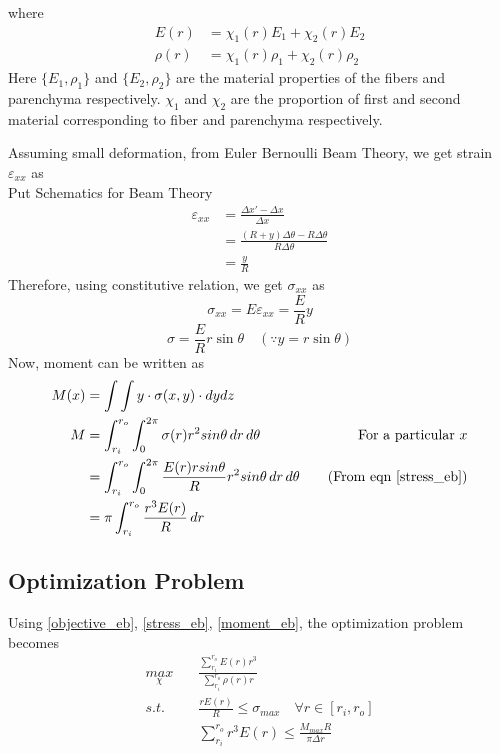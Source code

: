 \documentclass[10pt]{article}
\begin{document}
where 
\begin{equation}
\begin{split}
E(r) &= \chi_1(r) E_1 + \chi_2(r) E_2\\
\rho(r) &= \chi_1(r) \rho_1 + \chi_2(r) \rho_2
\end{split}
\end{equation}
Here $\{E_1, \rho_1\}$ and $\{E_2, \rho_2\}$ are the material properties of the fibers and parenchyma respectively. $\chi_1$ and $\chi_2$ are the proportion of first and second material corresponding to fiber and parenchyma respectively.\par
Assuming small deformation, from Euler Bernoulli Beam Theory, we get strain $\varepsilon_{xx}$ as\\
Put Schematics for Beam Theory
\begin{equation}
\begin{split}
\varepsilon_{xx} &= \frac{\Delta x' - \Delta x}{\Delta x}\\
&= \frac{(R+y)\Delta\theta - R\Delta\theta}{R\Delta\theta}\\
&= \frac{y}{R}
\end{split}
\end{equation}
Therefore, using constitutive relation, we get $\sigma_{xx}$ as
\begin{equation}
\sigma_{xx} = E\varepsilon_{xx} = \frac{E}{R}y
\end{equation}
\begin{equation}\label{stress_eb}
\sigma = \frac{E}{R}r\sin\theta \quad (\because y = r\sin\theta)
\end{equation}
Now, moment can be written as
\begin{equation}\label{moment_eb}
\begin{split}
M(x) &= \int\int y\cdot\sigma(x,y)\cdot dydz\\
M &= \int_{r_i}^{r_o}\int_0^{2\pi}\sigma(r)r^2 sin\theta\,dr\,d\theta & \text{For a particular $x$}\\
&=\int_{r_i}^{r_o}\int_0^{2\pi} \frac{E(r)r sin\theta}{R}r^2 sin\theta\,dr\,d\theta &\quad (\text{From eqn }\eqref{stress_eb})\\
&=\pi\int_{r_i}^{r_o}\frac{r^3 E(r)}{R}\,dr
\end{split}
\end{equation}
\subsection{Optimization Problem}
Using \eqref{objective_eb}, \eqref{stress_eb}, \eqref{moment_eb}, the optimization problem becomes
\begin{equation}
\begin{split}
\underset{\chi}{max} \quad& \frac{\sum^{r_o}_{r_i}E(r)r^3}{\sum^{r_o}_{r_i}\rho(r)r}\\
s.t. \quad& \frac{rE(r)}{R}\leq \sigma_{max} \quad \forall r \in [r_i, r_o]\\
& \sum_{r_i}^{r_o}r^3E(r)\leq \frac{M_{max}R}{\pi\Delta r}
\end{split}
\end{equation}
\end{document}
